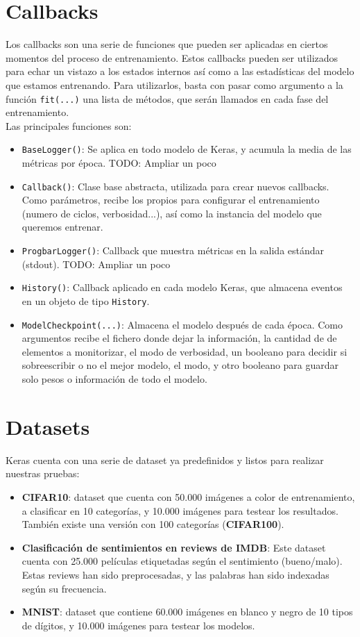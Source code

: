 \section{Callbacks}
Los callbacks son una serie de funciones que pueden ser aplicadas en ciertos momentos del proceso de entrenamiento. Estos callbacks pueden ser utilizados para echar un vistazo a los estados internos así como a las estadísticas del modelo que estamos entrenando. Para utilizarlos, basta con pasar como argumento a la función \lstinline{fit(...)} una lista de métodos, que serán llamados en cada fase del entrenamiento.\\
Las principales funciones son:
\begin{itemize}
\item \lstinline{BaseLogger()}: Se aplica en todo modelo de Keras, y acumula la media de las métricas por época. TODO: Ampliar un poco
\item \lstinline{Callback()}: Clase base abstracta, utilizada para crear nuevos callbacks. Como parámetros, recibe los propios para configurar el entrenamiento (numero de ciclos, verbosidad...), así como la instancia del modelo que queremos entrenar.
\item \lstinline{ProgbarLogger()}: Callback que muestra métricas en la salida estándar (stdout). TODO: Ampliar un poco
\item \lstinline{History()}: Callback aplicado en cada modelo Keras, que almacena eventos en un objeto de tipo \lstinline{History}.
\item \lstinline{ModelCheckpoint(...)}: Almacena el modelo después de cada época. Como argumentos recibe el fichero donde dejar la información, la cantidad de de elementos a monitorizar, el modo de verbosidad, un booleano para decidir si sobreescribir o no el mejor modelo, el modo, y otro booleano para guardar solo pesos o información de todo el modelo.
\end{itemize}

\section{Datasets}
Keras cuenta con una serie de dataset ya predefinidos y listos para realizar nuestras pruebas:
\begin{itemize}
\item \textbf{CIFAR10}: dataset que cuenta con 50.000 imágenes a color de entrenamiento, a clasificar en 10 categorías, y 10.000 imágenes para testear los resultados. También existe una versión con 100 categorías (\textbf{CIFAR100}).
\item \textbf{Clasificación de sentimientos en reviews de IMDB}: Este dataset cuenta con 25.000 películas etiquetadas según el sentimiento (bueno/malo). Estas reviews han sido preprocesadas, y las palabras han sido indexadas según su frecuencia.
\item \textbf{MNIST}: dataset que contiene 60.000 imágenes en blanco y negro de 10 tipos de dígitos, y 10.000 imágenes para testear los modelos.
\end{itemize}

